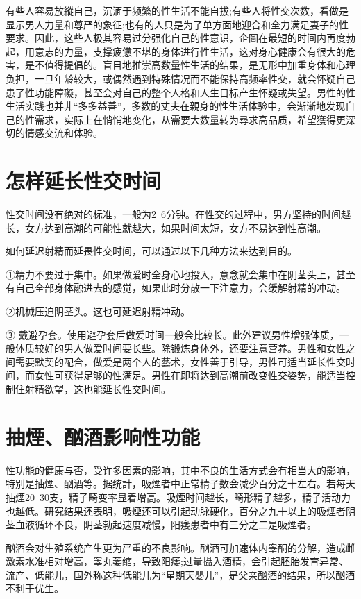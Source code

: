 \documentclass[12pt,UTF8]{ctexbook}
\begin{document}
有些人容易放縱自己，沉湎于频繁的性生活不能自拔;有些人将性交次数，看做是显示男人力量和尊严的象征;也有的人只是为了单方面地迎合和全力满足妻子的性要求。因此，这些人极其容易过分强化自己的性意识，企圖在最短的时间内再度勃起，用意志的力量，支撑疲憊不堪的身体进行性生活，这对身心健康会有很大的危害，是不值得提倡的。盲目地推崇高数量性生活的结果，是无形中加重身体和心理负担，一旦年龄较大，或偶然遇到特殊情况而不能保持高频率性交，就会怀疑自己患了性功能障礙，甚至会对自己的整个人格和人生目标产生怀疑或失望。男性的性生活实践也并非“多多益善”，多数的丈夫在親身的性生活体验中，会渐渐地发现自己的性需求，实际上在悄悄地变化，从需要大数量转为尋求高品质，希望獲得更深切的情感交流和体验。

\section{怎样延长性交时间}

性交时间没有绝对的标准，一般为2~6分钟。在性交的过程中，男方坚持的时间越长，女方达到高潮的可能性就越大，如果时间太短，女方不易达到性高潮。

如何延迟射精而延畏性交时间，可以通过以下几种方法来达到目的。

①精力不要过于集中。如果做爱时全身心地投入，意念就会集中在阴茎头上，甚至有自己全部身体融进去的感觉，如果此时分散一下注意力，会缓解射精的冲动。

②机械压迫阴茎头。这也可延迟射精冲动。

③ 戴避孕套。使用避孕套后做爱时间一般会比较长。此外建议男性增强体质，一般体质较好的男人做爱时间要长些。除锻炼身体外，还要注意营养。男性和女性之间需要默契的配合，做爱是两个人的藝术，女性善于引导，男性可适当延长性交时间，而女性可获得足够的性满足。男性在即将达到高潮前改变性交姿势，能适当控制住射精欲望，这也能延长性交时间。

\section{抽煙、酗酒影响性功能}

性功能的健康与否，受许多因素的影响，其中不良的生活方式会有相当大的影响，特别是抽煙、酗酒等。据统計，吸煙者中正常精子数会减少百分之十左右。若每天抽煙20~30支，精子畸变率显着增高。吸煙时间越长，畸形精子越多，精子活动力也越低。研究结果还表明，吸煙还可以引起动脉硬化，百分之九十以上的吸煙者阴茎血液循环不良，阴茎勃起速度减慢，阳痿患者中有三分之二是吸煙者。

酗酒会对生殖系统产生更为严重的不良影响。酗酒可加速体内睾酮的分解，造成雌激素水准相对增高，睾丸萎缩，导致阳痿;过量攝入酒精，会引起胚胎发育异常、流产、低能儿，国外称这种低能儿为“星期天嬰儿”，是父亲酗酒的结果，所以酗酒不利于优生。
\end{document}
